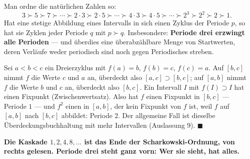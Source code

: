 \begin{merksatz}
Man ordne die natürlichen Zahlen so:
\[ 3 \succ 5 \succ 7 \succ \cdots \succ 2\cdot3 \succ 2\cdot5 \succ \cdots \succ 4\cdot3 \succ 4\cdot5 \succ \cdots \succ 2^{3} \succ 2^{2} \succ 2 \succ 1 . \]
Hat eine stetige Abbildung eines Intervalls in sich einen Zyklus der Periode $p$, so hat sie Zyklen jeder Periode $q$ mit $p \succ q$. Insbesondere: \textbf{Periode drei erzwingt alle Perioden} --- und überdies eine überabzählbare Menge von Startwerten, deren Verläufe weder periodisch sind noch gegen Periodisches streben.

Sei $a < b < c$ ein Dreierzyklus mit $f(a) = b$, $f(b) = c$, $f(c) = a$. Auf $[b,c]$ nimmt $f$ die Werte $c$ und $a$ an, überdeckt also $[a,c] \supset [b,c]$; auf $[a,b]$ nimmt $f$ die Werte $b$ und $c$ an, überdeckt also $[b,c]$. Ein Intervall $I$ mit $f(I) \supset I$ hat einen Fixpunkt (Zwischenwertsatz). Also hat $f$ einen Fixpunkt in $[b,c]$ --- Periode $1$ --- und $f^{2}$ einen in $[a,b]$, der kein Fixpunkt von $f$ ist, weil $f$ auf $[a,b]$ nach $[b,c]$ abbildet: Periode $2$. Der allgemeine Fall ist dieselbe Überdeckungsbuchhaltung mit mehr Intervallen (Auslassung 9). $\blacksquare$

\begin{center}
\begin{minipage}{0.9\textwidth}
\textbf{Die Kaskade $1, 2, 4, 8, \ldots$ ist das Ende der Scharkowski-Ordnung, von rechts gelesen. Periode drei steht ganz vorn: Wer sie sieht, hat alles.}
\end{minipage}
\end{center}

\begin{center}
\begin{minipage}{0.88\textwidth}
\end{minipage}
\end{center}
\end{merksatz}

